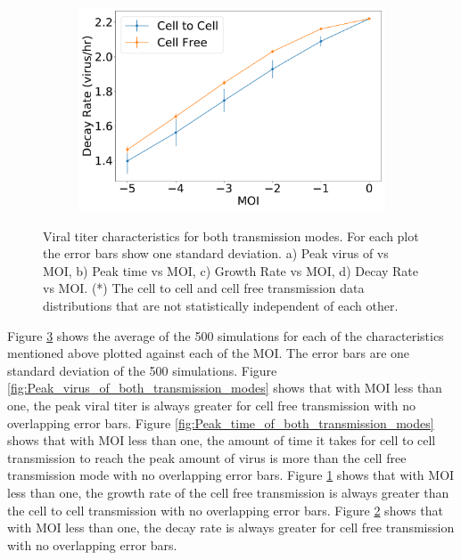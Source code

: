 \documentclass[a4paper]{article}
\begin{document}
\begin{figure}[h]
\begin{subfigure}[b]{0.4\linewidth}
        \caption{}
        \label{fig:Growth_Rate_of_both_transmission_modes}
    \end{subfigure}
    \begin{subfigure}[b]{0.4\linewidth}
        \includegraphics[width=\linewidth]{Graphs/DownSlopevsMOI.pdf}
        \caption{}
        \label{fig:Decay_Rate_of_both_transmission_modes}
    \end{subfigure}
    \caption{Viral titer characteristics for both transmission modes. For each plot the error bars show one standard deviation. a) Peak virus of vs MOI, b) Peak time vs MOI, c) Growth Rate vs MOI, d) Decay Rate vs MOI. (*) The cell to cell and cell free transmission data distributions that are not statistically independent of each other.}
    \label{fig:Graphs}
\end{figure}

Figure \ref{fig:Graphs} shows the average of the 500 simulations for each of the characteristics mentioned above plotted against each of the MOI. The error bars are one standard deviation of the 500 simulations. Figure \ref{fig:Peak_virus_of_both_transmission_modes} shows that with MOI less than one, the peak viral titer is always greater for cell free transmission with no overlapping error bars. Figure \ref{fig:Peak_time_of_both_transmission_modes} shows that with MOI less than one, the amount of time it takes for cell to cell transmission to reach the peak amount of virus is more than the cell free transmission mode with no overlapping error bars. Figure \ref{fig:Growth_Rate_of_both_transmission_modes} shows that with MOI less than one, the growth rate of the cell free transmission is always greater than the cell to cell transmission with no overlapping error bars. Figure \ref{fig:Decay_Rate_of_both_transmission_modes} shows that with MOI less than one, the decay rate is always greater for cell free transmission with no overlapping error bars. 
\end{document}
